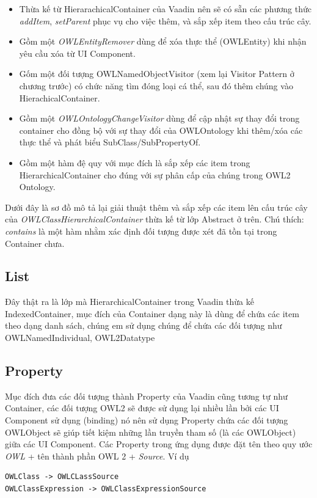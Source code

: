 \begin{itemize}
	
\item Thừa kế từ HierarachicalContainer của Vaadin nên sẽ có sẵn các phương thức \textit{addItem}, \textit{setParent} phục vụ cho việc thêm, và sắp xếp item theo cấu trúc cây.
\item Gồm một \textit{OWLEntityRemover} dùng để xóa thực thể (OWLEntity) khi nhận yêu cầu xóa từ UI Component.
\item Gốm một đối tượng OWLNamedObjectVisitor (xem lại Visitor Pattern ở chương trước) có chức năng tìm đóng loại cá thể, sau đó thêm chúng vào HierachicalContainer.
\item Gồm một \textit{OWLOntologyChangeVisitor} dùng để cập nhật sự thay đổi trong container cho đồng bộ với sự thay đổi của OWLOntology khi thêm/xóa các thực thể và phát biểu SubClass/SubPropertyOf.
\item Gồm một hàm đệ quy với mục đích là sắp xếp các item trong HierarchicalContainer cho đúng với sự phân cấp của chúng trong OWL2 Ontology.
\end{itemize}
Dưới đây là sơ đồ mô tả lại giải thuật thêm và sắp xếp các item lên cấu trúc cây của \textit{OWLClassHierarchicalContainer} thừa kế từ lớp Abstract ở trên. Chú thích: \textit{contains} là một hàm nhằm xác định đối tượng được xét đã tồn tại trong Container chưa.

\subsection{List}
Đây thật ra là lớp mà HierarchicalContainer trong Vaadin thừa kế IndexedContainer, mục đích của Container dạng này là dùng để chứa các item theo dạng danh sách, chúng em sử dụng chúng để chứa các đối tượng như OWLNamedIndividual, OWL2Datatype 
\subsection{Property}
Mục đích đưa các đối tượng thành Property của Vaadin cũng tương tự như Container, các đối tượng OWL2 sẽ được sử dụng lại nhiều lần bởi các UI Component sử dụng (binding) nó nên sử dụng Property chứa các đối tượng OWLObject sẽ giúp tiết kiệm những lần truyền tham số (là các OWLObject) giữa các UI Component. Các Property trong ứng dụng được đặt tên theo quy ước \textit{OWL} + tên thành phần OWL 2 + \textit{Source}. Ví dụ
\begin{verbatim}
OWLClass -> OWLCLassSource
OWLClassExpression -> OWLClassExpressionSource
\end{verbatim}

